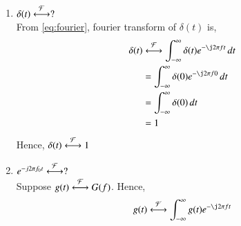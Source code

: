 \documentclass[journal,12pt,twocolumn]{IEEEtran}
\renewcommand\thesection{\arabic{section}}
\begin{document}
\begin{enumerate}[label=\thesection.\arabic*
	,ref=\thesection.\theenumi]
\begin{align}
	g(-k)=\int_{-\infty}^{\infty}G(f)e^{\j2\pi fk}\,df
\end{align}
Let $f=t$,then,
\begin{align}
	\label{eq:3.4}
	g(-k)=\int_{-\infty}^{\infty}G(t)e^{\j2\pi tk}\,dt
\end{align}
Substituting $k=f$ and in the \eqref{eq:3.4}, we get, 
\begin{align}
	\label{eq:3.4.1}
	g(-f)=\int_{-\infty}^{\infty}G(t)e^{\j2\pi ft}\,dt
\end{align}
Comparing \eqref{eq:3.4.1} with \eqref{eq:fourier}, we can say that,
\begin{align}
	G(t)&\system{F}g(-f)
\end{align}
	\item $\delta(t)\overset{\mathcal{F}}{ \longleftrightarrow}?$\\
	\solution From \eqref{eq:fourier}, fourier transform of $\delta(t)$ is,
	\begin{align}
		\delta(t)&\system{F} \int_{-\infty}^{\infty}\delta(t) e^{-\j2\pi ft} \,dt\\
		&=\int_{-\infty}^{\infty}\delta(0) e^{-\j2\pi f 0} \,dt\\
		&=\int_{-\infty}^{\infty}\delta(0) \,dt \\
		&=1
	\end{align}
Hence,
$\delta(t) \overset{\mathcal{F}}{ \longleftrightarrow} 1$
	\item $e^{-j2\pi f_0t}\overset{\mathcal{F}}{ \longleftrightarrow}?$\\
	\solution Suppose $g(t)\overset{\mathcal{F}}{ \longleftrightarrow}G(f)$. Hence,
\begin{align}
	g(t)&\system{F} \int_{-\infty}^{\infty}g(t)e^{-\j2\pi ft}\\

\end{align}
\end{enumerate}
\end{document}
